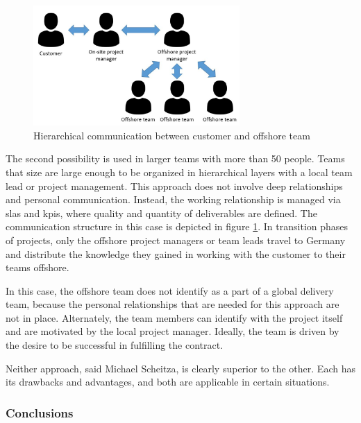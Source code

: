 \vspace{3mm}
\begin{figure}[htbp]
	\centering
	\includegraphics[width=0.7\textwidth]{Pictures/Hierarchy}
	\caption{Hierarchical communication between customer and offshore team}
	\label{fig:hierarchy}
\end{figure}

The second possibility is used in larger teams with more than 50 people. Teams that size are large enough to be organized in hierarchical layers with a local team lead or project management. This approach does not involve deep relationships and personal communication. Instead, the working relationship is managed via \glspl{sla} and \glspl{kpi}, where quality and quantity of deliverables are defined. The communication structure in this case is depicted in figure \ref{fig:hierarchy}. In transition phases of projects, only the offshore project managers or team leads travel to Germany and distribute the knowledge they gained in working with the customer to their teams offshore.

In this case, the offshore team does not identify as a part of a global delivery team, because the personal relationships that are needed for this approach are not in place. Alternately, the team members can identify with the project itself and are motivated by the local project manager. Ideally, the team is driven by the desire to be successful in fulfilling the contract.

Neither approach, said Michael Scheitza, is clearly superior to the other. Each has its drawbacks and advantages, and both are applicable in certain situations.

\subsubsection{Conclusions}

